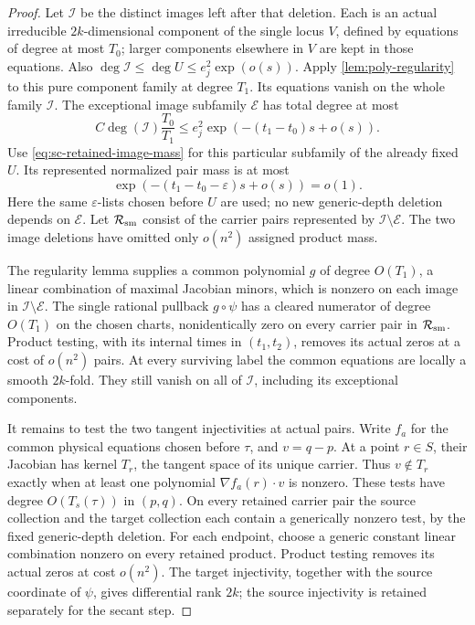 \begin{proof}
Let $\mathcal{I}$ be the distinct images left after that deletion. Each is an actual irreducible $2k$-dimensional component of the single locus $V$, defined by equations of degree at most $T_0$; larger components elsewhere in $V$ are kept in those equations.  Also $\deg\mathcal{I}\le\deg U\le e_j^2\exp(o(s))$. Apply \cref{lem:poly-regularity} to this pure component family at degree $T_1$.  Its equations vanish on the whole family $\mathcal{I}$. The exceptional image subfamily $\mathcal{E}$ has total degree at most
\[
 C\deg(\mathcal{I})\frac{T_0}{T_1}
 \le e_j^2\exp(-(t_1-t_0)s+o(s)).
\]
Use \eqref{eq:sc-retained-image-mass} for this particular subfamily of the already fixed $U$.  Its represented normalized pair mass is at most
\[
 \exp(-(t_1-t_0-\varepsilon)s+o(s))=o(1).
\]
Here the same $\varepsilon$-lists chosen before $U$ are used; no new generic-depth deletion depends on $\mathcal{E}$.  Let $\mathcal{R}_{\rm sm}$ consist of the carrier pairs represented by $\mathcal{I}\setminus\mathcal{E}$.  The two image deletions have omitted only $o(n^2)$ assigned product mass.

The regularity lemma supplies a common polynomial $g$ of degree $O(T_1)$, a linear combination of maximal Jacobian minors, which is nonzero on each image in $\mathcal{I}\setminus\mathcal{E}$.  The single rational pullback $g\circ\psi$ has a cleared numerator of degree $O(T_1)$ on the chosen charts, nonidentically zero on every carrier pair in $\mathcal{R}_{\rm sm}$. Product testing, with its internal times in $(t_1,t_2)$, removes its actual zeros at a cost of $o(n^2)$ pairs.  At every surviving label the common equations are locally a smooth $2k$-fold.  They still vanish on all of $\mathcal{I}$, including its exceptional components.

It remains to test the two tangent injectivities at actual pairs. Write $f_a$ for the common physical equations chosen before $\tau$, and $v=q-p$.  At a point $r\in S$, their Jacobian has kernel $T_r$, the tangent space of its unique carrier.  Thus $v\notin T_r$ exactly when at least one polynomial $\nabla f_a(r)\mathbin{\cdot}v$ is nonzero.  These tests have degree $O(T_s(\tau))$ in $(p,q)$.  On every retained carrier pair the source collection and the target collection each contain a generically nonzero test, by the fixed generic-depth deletion.  For each endpoint, choose a generic constant linear combination nonzero on every retained product.  Product testing removes its actual zeros at cost $o(n^2)$. The target injectivity, together with the source coordinate of $\psi$, gives differential rank $2k$; the source injectivity is retained separately for the secant step.


\end{proof}
